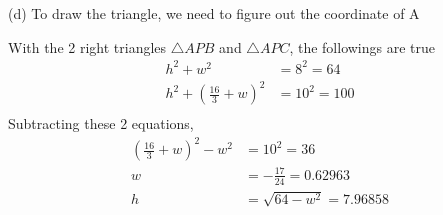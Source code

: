 \documentclass[12pt]{simple_doc}
\begin{document}
    (d) To draw the triangle, we need to figure out the coordinate of A
    \begin{center}
    \end{center}
    With the 2 right triangles $\triangle APB$ and $\triangle APC$, the followings are true
    \begin{equation*}
        \begin{aligned}
            h^2 + w^2 &= 8^2 = 64 \\
            h^2 + (\frac{16}{3} + w)^2 &= 10^2 = 100\\
        \end{aligned}
	\end{equation*}
    Subtracting these 2 equations,
    \begin{equation*}
        \begin{aligned}
            (\frac{16}{3} + w)^2 - w^2 &= 10^2 = 36\\
            w &= - \frac{17}{24} = 0.62963\\
            h &= \sqrt{64 - w^2} = 7.96858
        \end{aligned}
	\end{equation*}
\end{document}
